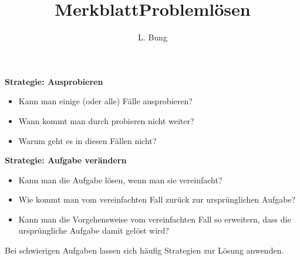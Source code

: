\documentclass[11pt, a4paper, oneside]{article}
\begin{document}
	\begin{landscape}
		\begin{center}
			\fontsize{30pt}{10pt}\selectfont
			\vspace*{2cm}
			\textbf{Strategie: Ausprobieren}
		\end{center}
		
		\vspace{2cm}
		\huge
		\begin{itemize}
			\item Kann man einige (oder alle) Fälle ausprobieren?
			\item Wann kommt man durch probieren nicht weiter?
			\item Warum geht es in diesen Fällen nicht?
		\end{itemize}
	\end{landscape}

	\begin{landscape}
		\begin{center}
			\fontsize{30pt}{10pt}\selectfont
			\vspace*{2cm}
			\textbf{Strategie: Aufgabe verändern}
		\end{center}
		
		\vspace{2cm}
		\huge
		\begin{itemize}
			\item Kann man die Aufgabe lösen, wenn man sie vereinfacht?
			\item Wie kommt man vom vereinfachten Fall zurück zur ursprünglichen Aufgabe?
			\item Kann man die Vorgehensweise vom vereinfachten Fall so erweitern, dass die ursprüngliche Aufgabe damit gelöst wird?
		\end{itemize}
	\end{landscape}

	\pagebreak
	\author{L. Bung}
	\title{Merkblatt\hspace{10cm}Problemlösen}
	\subject{Mathematik}
	\maketitle
	
	Bei schwierigen Aufgaben lassen sich häufig Strategien zur Lösung anwenden.
	
\end{document}
